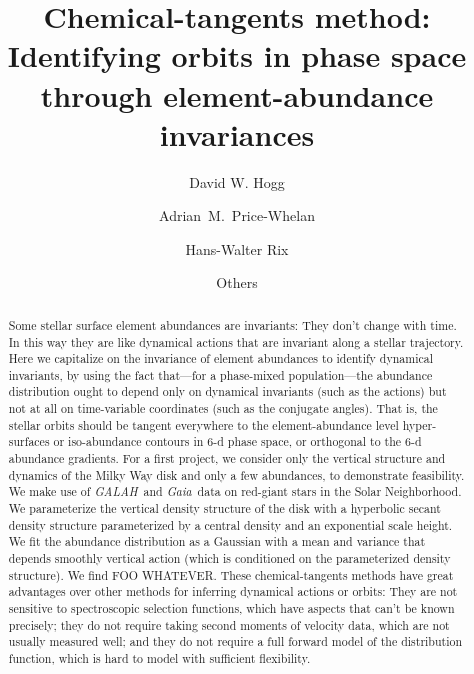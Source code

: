 \documentclass[modern]{aastex62}
\newcommand{\acronym}[1]{{\small{#1}}}
\newcommand{\project}[1]{\textsl{#1}}
\newcommand{\galah}{\project{\acronym{GALAH}}}
\newcommand{\gaia}{\project{Gaia}}
\begin{document}
\sloppy\sloppypar\raggedbottom\frenchspacing %
\graphicspath{ {figures/} }

\title{\textbf{%
Chemical-tangents method:\\
Identifying orbits in phase space through element-abundance invariances}}

\author[0000-0003-2866-9403]{David W. Hogg}

\author[0000-0003-0872-7098]{Adrian~M.~Price-Whelan}

\author[0000-0003-4996-9069]{Hans-Walter Rix}

\author{Others}

\begin{abstract}\noindent
Some stellar surface element abundances are invariants: They don't change with time.
In this way they are like dynamical actions that are invariant along a stellar trajectory.
Here we capitalize on the invariance of element abundances to identify dynamical
invariants, by using the fact that---for a phase-mixed population---the abundance
distribution ought to depend only on dynamical invariants (such as the actions)
but not at all on time-variable coordinates (such as the conjugate angles).
That is, the stellar orbits should be tangent everywhere to the
element-abundance level hyper-surfaces or iso-abundance contours in 6-d phase
space, or orthogonal to the 6-d abundance gradients.
For a first project, we consider only the vertical structure and dynamics of the Milky Way
disk and only a few abundances, to demonstrate feasibility.
We make use of \galah\ and \gaia\ data on red-giant stars in the Solar Neighborhood.
We parameterize the vertical density structure of the disk with a hyperbolic secant density
structure parameterized by a central density and an
exponential scale height.
We fit the abundance distribution as a Gaussian with a mean and variance that depends
smoothly vertical action (which is conditioned on the parameterized density structure).
We find FOO WHATEVER.
These chemical-tangents methods have great advantages over other methods
for inferring dynamical actions or orbits: They are not sensitive to spectroscopic
selection functions, which have aspects that can't be known precisely; they
do not require taking second moments of velocity data, which are not usually measured
well; and they do not require a full forward model of the distribution function,
which is hard to model with sufficient flexibility.
\end{abstract}
\end{document}

